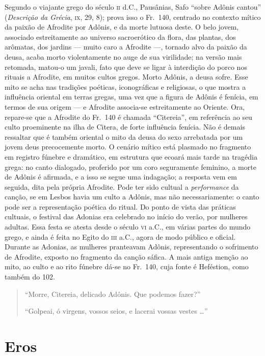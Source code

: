 {\small Segundo o viajante grego do século \textsc{ii} d.C., Pausânias, Safo “sobre
Adônis cantou” (\textit{Descrição da Grécia}, \textsc{ix}, 29, 8); prova isso o Fr.~140, 
centrado no contexto mítico da paixão de Afrodite por Adônis, e da morte
lutuosa deste. O belo jovem, associado estreitamente ao universo sacroerótico da
flora, das plantas, dos arômatas, dos jardins --- muito caro a Afrodite ---,
tornado alvo da paixão da deusa, acaba morto violentamente no auge de sua
virilidade; na versão mais retomada, matou-o um javali, fato que deve se ligar
à interdição do porco nos rituais a Afrodite, em muitos cultos gregos. Morto
Adônis, a deusa sofre. Esse mito se acha nas tradições poéticas, iconográficas
e religiosas, o que mostra a influência oriental em terras gregas, uma vez que
a figura de Adônis é fenícia, em termos de sua origem --- e Afrodite associa-se
estreitamente ao Oriente. Ora, repare-se que a Afrodite do Fr.~140 é chamada
``Citereia”, em referência ao seu culto proeminente na ilha de Citera,
de forte influência fenícia. Não é demais ressaltar que é também oriental o
mito da deusa do sexo arrebatada por um jovem deus precocemente morto. O
cenário mítico está plasmado no fragmento em registro fúnebre e dramático, em
estrutura que ecoará mais tarde na tragédia grega: no canto dialogado,
proferido por um coro seguramente feminino, a morte de Adônis é afirmada, e a isso
se segue uma indagação; a resposta vem em seguida, dita pela própria Afrodite.
Pode ter sido cultual a \textit{performance} da canção, se em Lesbos havia um
culto a Adônis, mas não necessariamente: o canto pode ser a representação
poética do ritual. Do ponto de vista das práticas cultuais, o festival das Adonias 
era celebrado no início do verão, por mulheres adultas. Essa festa se atesta 
desde o século \textsc{vi} a.C., em várias partes do
mundo grego, e ainda é feita no Egito do \textsc{iii} a.C., agora de modo público e
oficial. Durante as Adonias, as mulheres pranteavam Adônis, representando o
sofrimento de Afrodite, exposto no fragmento da canção sáfica. A mais antiga
menção ao mito, ao culto e ao rito fúnebre dá-se no Fr.~140, cuja fonte é
Heféstion, como também do 102.}

\begin{verse}
“Morre, Citereia, delicado Adônis. Que podemos fazer?”

“Golpeai, ó virgens, vossos seios, e lacerai vossas vestes \ldots{}”
\end{verse}

\oneside

\chapter{Eros}

